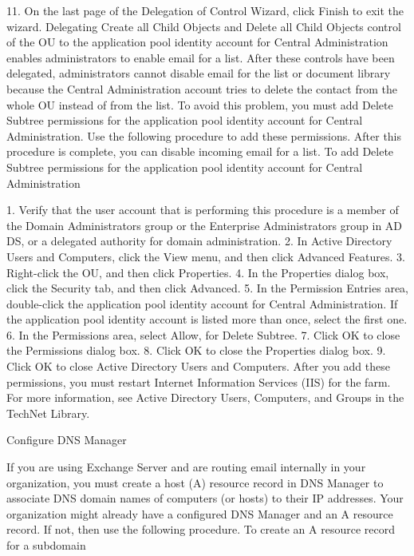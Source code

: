 11.	On the last page of the Delegation of Control Wizard, click Finish to exit the wizard.
Delegating Create all Child Objects and Delete all Child Objects control of the OU to the application pool identity account for Central Administration enables administrators to enable email for a list. After these controls have been delegated, administrators cannot disable email for the list or document library because the Central Administration account tries to delete the contact from the whole OU instead of from the list.
To avoid this problem, you must add Delete Subtree permissions for the application pool identity account for Central Administration. Use the following procedure to add these permissions. After this procedure is complete, you can disable incoming email for a list.
To add Delete Subtree permissions for the application pool identity account for Central Administration

1.	Verify that the user account that is performing this procedure is a member of the Domain Administrators group or the Enterprise Administrators group in AD DS, or a delegated authority for domain administration.
2.	In Active Directory Users and Computers, click the View  menu, and then click Advanced Features.
3.	Right-click the OU, and then click Properties.
4.	In the Properties dialog box, click the Security tab, and then click Advanced.
5.	In the Permission Entries area, double-click the application pool identity account for Central Administration.
If the application pool identity account is listed more than once, select the first one.
6.	In the Permissions area, select Allow, for Delete Subtree.
7.	Click OK to close the Permissions dialog box.
8.	Click OK to close the Properties dialog box.
9.	Click OK to close Active Directory Users and Computers.
After you add these permissions, you must restart Internet Information Services (IIS) for the farm.
For more information, see Active Directory Users, Computers, and Groups in the TechNet Library.

Configure DNS Manager

If you are using Exchange Server and are routing email internally in your organization, you must create a host (A) resource record in DNS Manager to associate DNS domain names of computers (or hosts) to their IP addresses. Your organization might already have a configured DNS Manager and an A resource record. If not, then use the following procedure.
To create an A resource record for a subdomain

